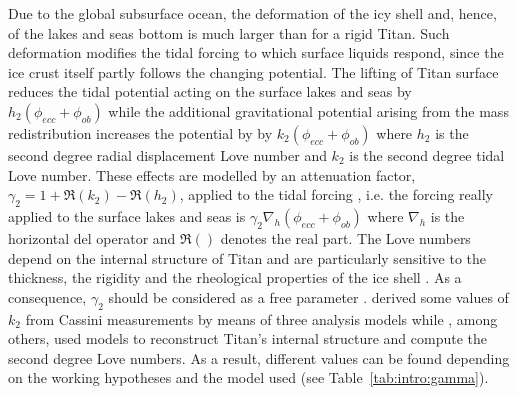 Due to the global subsurface ocean, the deformation of the icy shell and, hence, of the lakes and seas bottom is much larger than for a rigid Titan. Such deformation modifies the tidal forcing to which surface liquids respond, since the ice crust itself partly follows the changing potential. The lifting of Titan surface reduces the tidal potential acting on the surface lakes and seas by $h_2\left(\phi_{ecc}+\phi_{ob}\right)$ while the additional gravitational potential arising from the mass redistribution increases the potential by by $k_2\left(\phi_{ecc}+\phi_{ob}\right)$ where $h_2$ is the second degree radial displacement Love number and $k_2$ is the second degree tidal Love number. These effects are modelled by an attenuation factor, $\gamma_2= 1+\Re(k_2)-\Re(h_2)$, applied to the tidal forcing \citep{lorenz2014radar,tokano2014numerical,beuthe2015tides,beuthe2015tidal}, i.e. the forcing really applied to the surface lakes and seas is $\gamma_2\nabla_h\left(\phi_{ecc}+\phi_{ob}\right)$ where $\nabla_h$ is the horizontal del operator and $\Re()$ denotes the real part. The Love numbers depend on the internal structure of Titan and are particularly sensitive to the thickness, the rigidity and the rheological properties of the ice shell \citep[e.g.][]{sohl2003interior,lorenz2014radar,tokano2014numerical}. As a consequence, $\gamma_2$ should be considered as a free parameter \citep{lorenz2014radar}. \citet{iess2012tides} derived some values of $k_2$ from Cassini measurements by means of three analysis models while \citet{sohl2003interior, sohl2014structural, baland2014titan, lefevre2014structure, beuthe2015tidal,beuthe2015tides}, among others, used models to reconstruct Titan's internal structure and compute the second degree Love numbers. As a result, different values can be found depending on the working hypotheses and the model used (see Table~\ref{tab:intro:gamma}).


